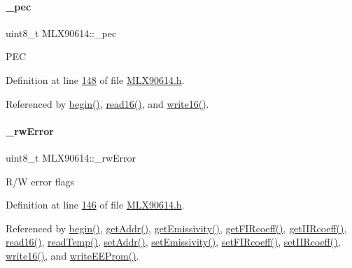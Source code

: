 \mbox{\label{class_m_l_x90614_a2526978eb988a8712baee6dca596be15}} 
\paragraph{\texorpdfstring{\+\_\+pec}{\_pec}}
{\footnotesize\ttfamily uint8\+\_\+t M\+L\+X90614\+::\+\_\+pec\hspace{0.3cm}{\ttfamily [private]}}

P\+EC 

Definition at line \mbox{\hyperlink{_m_l_x90614_8h_source_l00148}{148}} of file \mbox{\hyperlink{_m_l_x90614_8h_source}{M\+L\+X90614.\+h}}.



Referenced by \mbox{\hyperlink{_m_l_x90614_8cpp_source_l00068}{begin()}}, \mbox{\hyperlink{_m_l_x90614_8cpp_source_l00270}{read16()}}, and \mbox{\hyperlink{_m_l_x90614_8cpp_source_l00314}{write16()}}.

\mbox{\label{class_m_l_x90614_a8c203cc9359c283d07682ba7dbcc5de3}} 
\paragraph{\texorpdfstring{\+\_\+rw\+Error}{\_rwError}}
{\footnotesize\ttfamily uint8\+\_\+t M\+L\+X90614\+::\+\_\+rw\+Error\hspace{0.3cm}{\ttfamily [private]}}

R/W error flags 

Definition at line \mbox{\hyperlink{_m_l_x90614_8h_source_l00146}{146}} of file \mbox{\hyperlink{_m_l_x90614_8h_source}{M\+L\+X90614.\+h}}.



Referenced by \mbox{\hyperlink{_m_l_x90614_8cpp_source_l00068}{begin()}}, \mbox{\hyperlink{_m_l_x90614_8cpp_source_l00250}{get\+Addr()}}, \mbox{\hyperlink{_m_l_x90614_8cpp_source_l00120}{get\+Emissivity()}}, \mbox{\hyperlink{_m_l_x90614_8cpp_source_l00208}{get\+F\+I\+Rcoeff()}}, \mbox{\hyperlink{_m_l_x90614_8cpp_source_l00166}{get\+I\+I\+Rcoeff()}}, \mbox{\hyperlink{_m_l_x90614_8cpp_source_l00270}{read16()}}, \mbox{\hyperlink{_m_l_x90614_8cpp_source_l00084}{read\+Temp()}}, \mbox{\hyperlink{_m_l_x90614_8cpp_source_l00226}{set\+Addr()}}, \mbox{\hyperlink{_m_l_x90614_8cpp_source_l00107}{set\+Emissivity()}}, \mbox{\hyperlink{_m_l_x90614_8cpp_source_l00184}{set\+F\+I\+Rcoeff()}}, \mbox{\hyperlink{_m_l_x90614_8cpp_source_l00143}{set\+I\+I\+Rcoeff()}}, \mbox{\hyperlink{_m_l_x90614_8cpp_source_l00314}{write16()}}, and \mbox{\hyperlink{_m_l_x90614_8cpp_source_l00354}{write\+E\+E\+Prom()}}.

